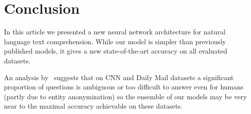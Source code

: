 \documentclass[11pt]{article}
\newcommand{\RUDA}[1]{{\color{black}#1}}
\begin{document}
\RUDA{


\section{Conclusion}
In this article we presented a new neural network architecture for natural language text comprehension. 
While our model is simpler than previously published models, it gives a new state-of-the-art accuracy on all evaluated datasets.

An analysis by~\cite{chen2016thorough} suggests that on CNN and Daily Mail datasets a significant proportion of questions is ambiguous or too difficult to answer even for humans (partly due to entity anonymization) so the ensemble of our models may be very near to the maximal accuracy achievable on these datasets.





}
\end{document}
